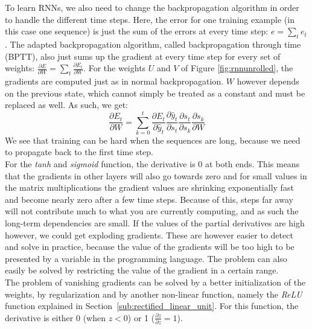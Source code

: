 To learn RNNs, we also need to change the backpropagation algorithm in order to handle the different time steps.
Here, the error for one training example (in this case one sequence) is just the sum of the errors at every time step: $e = \sum_t e_t$.
The adapted backpropagation algorithm, called backpropagation through time (BPTT), also just sums up the gradient at every time step for every set of weights:  $\frac{\partial E}{\partial W} = \sum_t \frac{\partial E_t}{\partial W}$.
For the weights $U$ and $V$ of Figure \ref{fig:rnnunrolled}, the gradients are computed just as in normal backpropagation.
$W$ however depends on the previous state, which cannot simply be treated as a constant and must be replaced as well.
As such, we get:
\begin{equation}
\frac{\partial E_t}{\partial W} = \sum_{k=0}^t \frac{\partial E_t}{\partial \hat{y}_t} \frac{\partial \hat{y}_t}{\partial s_t} \frac{\partial s_t}{\partial s_k} \frac{\partial s_k}{\partial W}
\end{equation}
We see that training can be hard when the sequences are long, because we need to propagate back to the first time step.\\

For the \textit{tanh} and \textit{sigmoid} function, the derivative is $0$ at both ends.
This means that the gradients in other layers will also go towards zero and for small values in the matrix multiplications the gradient values are shrinking exponentially fast and become nearly zero after a few time steps.
Because of this, steps far away will not contribute much to what you are currently computing, and as such the long-term dependencies are small.
If the values of the partial derivatives are high however, we could get exploding gradients.
These are however easier to detect and solve in practice, because the value of the gradients will be too high to be presented by a variable in the programming language.
The problem can also easily be solved by restricting the value of the gradient in a certain range.\\ %
The problem of vanishing gradients can be solved by a better initialization of the weights, by regularization and by another non-linear function, namely the \textit{ReLU} function explained in Section~\ref{sub:rectified_linear_unit}.
For this function, the derivative is either 0 (when $z<0$) or 1 ($\frac{\partial z}{\partial z} = 1$).\\

